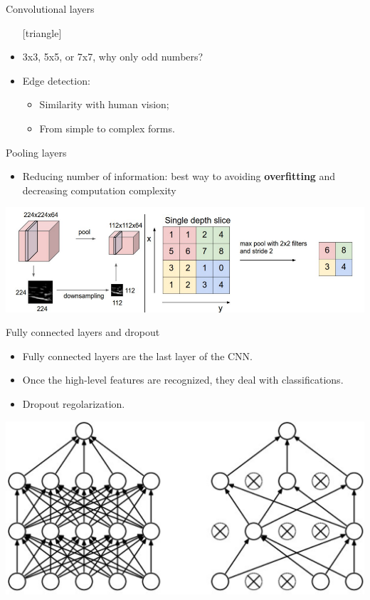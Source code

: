 \documentclass{beamer}
\begin{document}
\begin{frame}{Convolutional layers}
	\begin{itemize}
		\setlength\itemsep{1em}
		[triangle]
		\item 
			3x3, 5x5, or 7x7, why only odd numbers?
		\item 
			Edge detection:
			\begin{itemize}
				[circle]
				\item 
					Similarity with human vision;
				\item 
					From simple to complex forms.
			\end{itemize}
	\end{itemize}
\end{frame}

\begin{frame}{Pooling layers}
	\begin{itemize}
		\setlength\itemsep{1em}
		[triangle]
		\item 
			Reducing number of information: best way to avoiding \textbf{overfitting} and decreasing 							computation complexity
	\end{itemize}
	\includegraphics[scale=0.35]{pooling}
\end{frame}

\begin{frame}{Fully connected layers and dropout}
	\begin{itemize}
		\setlength\itemsep{1em}
		[triangle]
		\item 
			Fully connected layers are the last layer of the CNN.
		\item 
			Once the high-level features are recognized, they deal with classifications.
		\item
			Dropout regolarization.
	\end{itemize}
	\begin{center}
		\includegraphics[scale=0.35]{dropout}
	\end{center}
\end{frame}
\end{document}
